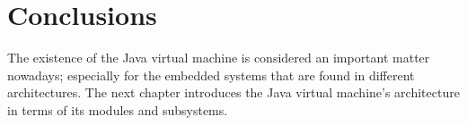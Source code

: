 \section{Conclusions}
The existence of the Java virtual machine is considered an important matter nowadays; 
especially for the embedded systems that are found in different architectures. 
The next chapter introduces the Java virtual machine's architecture in terms 
of its modules and subsystems.
